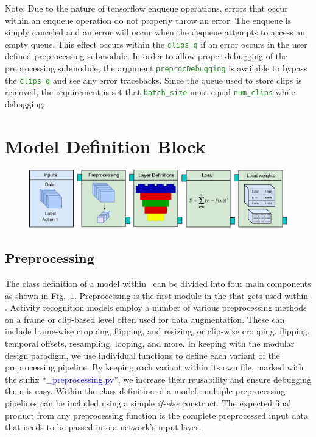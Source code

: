 \documentclass{llncs}
\begin{document}
Note: Due to the nature of tensorflow enqueue operations, errors that occur within an enqueue operation do not properly throw an error.
The enqueue is simply canceled and an error will occur when the dequeue attempts to access an empty queue.
This effect occurs within the \texttt{\textcolor{ForestGreen}{clips\_q}} if an error occurs in the user defined preprocessing submodule.
In order to allow proper debugging of the preprocessing submodule, the argument \texttt{\textcolor{ForestGreen}{preprocDebugging}} is available to bypass the \texttt{\textcolor{ForestGreen}{clips\_q}} and see any error tracebacks.
Since the queue used to store clips is removed, the requirement is set that \texttt{\textcolor{ForestGreen}{batch\_size}} must equal \texttt{\textcolor{ForestGreen}{num\_clips}} while debugging.



\section{Model Definition Block}
\label{sec:modeldefblock}

\begin{figure}[b!]
\centering
\includegraphics[width=\columnwidth]{images/model_submodule.pdf}
\caption{}
\label{fig:model_submodule}
\end{figure}


\subsection{Preprocessing}
The class definition of a model within \acro~can be divided into four main components as shown in Fig.~\ref{fig:model_submodule}.
Preprocessing is the first module in the \model that gets used within \data.
Activity recognition models employ a number of various preprocessing methods on a frame or clip-based level often used for data augmentation.
These can include frame-wise cropping, flipping, and resizing, or clip-wise cropping, flipping, temporal offsets, resampling, looping, and more.
In keeping with the modular design paradigm, we use individual functions to define each variant of the preprocessing pipeline.
By keeping each variant within its own file, marked with the suffix ``\textcolor{blue}{\_preprocessing.py}'', we increase their reusability and ensure debugging them is easy.
Within the class definition of a model, multiple preprocessing pipelines can be included using a simple \textit{if-else} construct.
The expected final product from any preprocessing function is the complete preprocessed input data that needs to be passed into a network's input layer.
\end{document}
